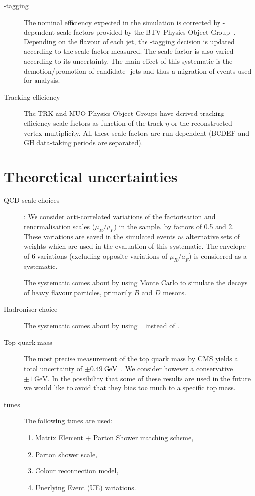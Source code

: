 \begin{description}
\item[\cPqb-tagging] The nominal efficiency expected in the simulation is corrected by \pt-dependent scale factors provided by the BTV Physics Object Group~\cite{twiki:BTV}. Depending on the flavour of each jet, the \cPqb-tagging decision is updated according to the scale factor measured. The scale factor is also varied according to its uncertainty. The main effect of this systematic is the demotion/promotion of candidate \cPqb-jets and thus a migration of events used for analysis.

\item[Tracking efficiency]
The TRK and MUO Physics Object Groups have derived tracking efficiency scale factors as function of the track $\eta$ or the reconstructed vertex multiplicity. All these scale factors are run-dependent (BCDEF and GH data-taking periods are separated).
\end{description}

\section{Theoretical uncertainties}
\begin{description}
\item[QCD scale choices]:
We consider anti-correlated variations of the factorisation and renormalisation scales ($\mu_R/\mu_F$) in the \ttbar sample, by factors of 0.5 and 2. These variations are saved in the simulated events as alternative sets of weights which are used in the evaluation of this systematic. The envelope of 6 variations (excluding opposite variations of $\mu_R/\mu_F$) is considered as a systematic.

\item[\EVTGEN] The systematic comes about by using \EVTGEN Monte Carlo to simulate the decays of heavy flavour particles, primarily $B$ and $D$ mesons. 

\item[Hadroniser choice] The systematic comes about by using \HERWIGpp~\cite{Bahr:2008pv} instead of .

\item[Top quark mass] The most precise measurement of the top quark mass by CMS yields a total uncertainty of $\pm0.49~\text{GeV}$~\cite{Khachatryan:2015hba}. We consider however a conservative $\pm1~\text{GeV}$. In the possibility that some of these results are used in the future we would like to avoid that they bias too much to a specific top mass.


\item[\PYTHIA tunes] The following \PYTHIA tunes are used:
  \begin{enumerate}
  \item Matrix Element + Parton Shower matching scheme, 
  \item Parton shower scale, 
  \item Colour reconnection model, 
  \item Unerlying Event (UE) variations. 
  \end{enumerate}
\end{description}


